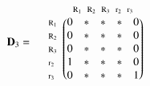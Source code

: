 \documentclass[a4paper,10pt]{article}
\begin{document}
\begin{equation*}
\mathbf{D}_3 = \; \; \; \; \; \begin{matrix}
 & 

\begin{matrix}
\text{\scriptsize $\mathrm{R}_1$} \!\!\! & 
\text{\scriptsize $\mathrm{R}_2$} \!\!\! & 
\text{\scriptsize $\mathrm{R}_3$} \!\!\! & 
\text{\scriptsize $\mathrm{r}_2$} \!\!\! & 
\text{\scriptsize $\mathrm{r}_3$}
\end{matrix}

\\ 

\begin{matrix*}[l]
\text{\scriptsize $\mathrm{R}_1$} \!\!\! \\
\text{\scriptsize $\mathrm{R}_2$} \!\!\! \\
\text{\scriptsize $\mathrm{R}_3$} \!\!\! \\
\text{\scriptsize $\mathrm{r}_2$} \!\!\! \\
\text{\scriptsize $\mathrm{r}_3$} \!\!\!
\end{matrix*}

& 

\begin{pmatrix}
0 & * & * & * & 0 \\
0 & * & * & * & 0 \\
0 & * & * & * & 0 \\
1 & * & * & * & 0 \\
0 & * & * & * & 1
\end{pmatrix}

\end{matrix}
\end{equation*}

\bigskip
\end{document}

